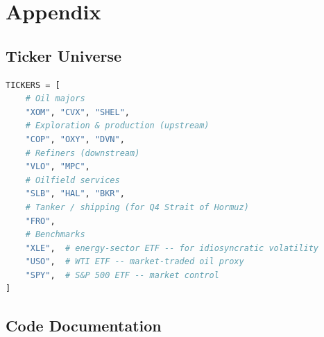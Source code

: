 \documentclass[11pt,a4paper]{article}
\begin{document}
\section{Appendix}
\label{appx:extras}

\subsection{Ticker Universe}
\label{appx:tickers}

\begin{lstlisting}[language=Python,caption={The 15-ticker tiered universe.},label={lst:tickers}]
TICKERS = [
    # Oil majors
    "XOM", "CVX", "SHEL",
    # Exploration & production (upstream)
    "COP", "OXY", "DVN",
    # Refiners (downstream)
    "VLO", "MPC",
    # Oilfield services
    "SLB", "HAL", "BKR",
    # Tanker / shipping (for Q4 Strait of Hormuz)
    "FRO",
    # Benchmarks
    "XLE",  # energy-sector ETF -- for idiosyncratic volatility
    "USO",  # WTI ETF -- market-traded oil proxy
    "SPY",  # S&P 500 ETF -- market control
]
\end{lstlisting}

\subsection{Code Documentation}
\label{appx:lambdas}
\end{document}
